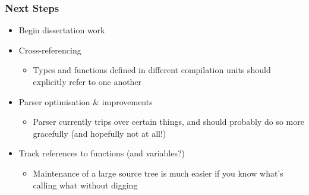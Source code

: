 \documentclass{beamer}
\begin{document}
  \begin{frame}
    \frametitle{Next Steps}
      \begin{itemize}
        \item Begin dissertation work
        \item Cross-referencing
          \begin{itemize}
            \item Types and functions defined in different compilation units
              should explicitly refer to one another
          \end{itemize}
        \item Parser optimisation \& improvements
          \begin{itemize}
            \item Parser currently trips over certain things, and should
              probably do so more gracefully (and hopefully not at all!)
          \end{itemize}
        \item Track references to functions (and variables?)
          \begin{itemize}
            \item Maintenance of a large source tree is much easier if you know
              what's calling what without digging
          \end{itemize}
      \end{itemize}
  \end{frame}
\end{document}
